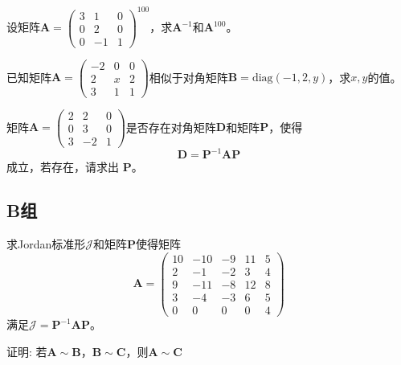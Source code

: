 \begin{reidai}
	设矩阵$\mathbf{A}=\begin{pmatrix}
		3 & 1 & 0 \\
		0 & 2 & 0 \\
		0 & -1 & 1
		\end{pmatrix}^{100}$，求$\mathbf{A}^{-1}$和$\mathbf{A}^{100}$。
\end{reidai}

\begin{reidai}
	已知矩阵$\mathbf{A}=\begin{pmatrix}
	-2 & 0 & 0 \\
	2 & x & 2 \\
	3 & 1 & 1
	\end{pmatrix}$相似于对角矩阵$\mathbf{B}=\text{diag}\left( -1,2,y \right)$，求$x,y$的值。
\end{reidai}

\begin{reidai}
	矩阵$\mathbf{A}=\begin{pmatrix}
2 & 2 & 0 \\
0 & 3 & 0 \\
3 & -2 & 1
\end{pmatrix}$是否存在对角矩阵$\mathbf{D}$和矩阵$\mathbf{P}$，使得$$\mathbf{D}=\mathbf{P}^{-1}\mathbf{A}\mathbf{P}$$成立，若存在，请求出 $\mathbf{P}$。
\end{reidai}

\subsection{B组}

\begin{reidai}
	求Jordan标准形$\mathscr{J}$和矩阵$\mathbf{P}$使得矩阵$$\mathbf{A}=\begin{pmatrix}
	10 & -10 & -9 & 11 & 5 \\
	2 & -1 & -2 & 3 & 4 \\
	9 & -11 & -8 & 12 & 8 \\
	3 & -4 & -3 & 6 & 5 \\
	0 & 0 & 0 & 0 & 4
	\end{pmatrix}$$满足$\mathscr{J}=\mathbf{P}^{-1}\mathbf{A}\mathbf{P}$。
\end{reidai}

\begin{reidai}
	证明: 若$\mathbf{A}\sim \mathbf{B}$，$\mathbf{B}\sim \mathbf{C}$，则$\mathbf{A}\sim\mathbf{C}$
\end{reidai}
